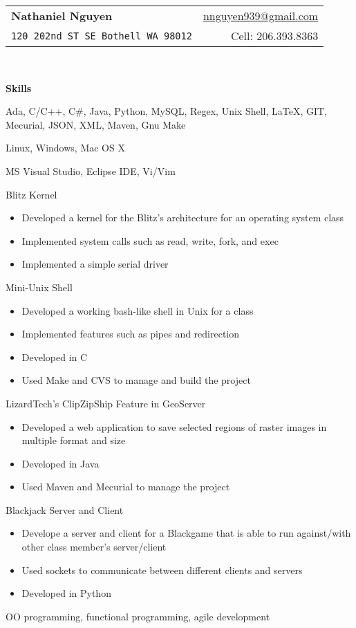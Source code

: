 \documentclass[letterpaper,11pt]{article}
\newcommand{\resitem}[1]{\item #1 \vspace{-2pt}}
\newcommand{\resheading}[1]{{\large \colorbox{mygrey}{\begin{minipage}{\textwidth}{\textbf{#1 \vphantom{p\^{E}}}}\end{minipage}}}}
\begin{document}
\newcommand{\mywebheader}{
\begin{tabular*}{7in}{l@{\extracolsep{\fill}}r}
	\textbf{{\LARGE Nathaniel Nguyen}} & \href{mailto:nnguyen939@gmail.com}{nnguyen939@gmail.com}\\
	{\footnotesize \texttt{{120 202nd ST SE Bothell WA 98012}}} & 
	{Cell:  206.393.8363}
	\end{tabular*}
\\
\vspace{0.1in}}

\mywebheader

\resheading{{Skills}}
	\begin{description}
		\item[Technologies:] { \footnotesize Ada, C/C++, C\#, Java, Python, MySQL, Regex, Unix Shell, {\LaTeX}, GIT, Mecurial, JSON, XML, Maven, Gnu Make}
		\item[Computer and OS:] { \footnotesize Linux, Windows, Mac OS X}
		\item[Software:]{\footnotesize
			{MS Visual Studio},
			{Eclipse IDE},
			{Vi/Vim}
} 
		\item[Projects:] {\footnotesize 
							\item Blitz Kernel
								\begin{itemize}
									\resitem{Developed a kernel for the Blitz's architecture for an operating system class}
									\resitem{Implemented system calls such as read, write, fork, and exec}
									\resitem{Implemented a simple serial driver}
								\end{itemize}
							\item Mini-Unix Shell
								\begin{itemize}
									\resitem{Developed a working bash-like shell in Unix for a class}
									\resitem{Implemented features such as pipes and redirection}
									\resitem{Developed in C}
									\resitem{Used Make and CVS to manage and build the project}
								\end{itemize}
								
							\item LizardTech's ClipZipShip Feature in GeoServer
								\begin{itemize}
									\resitem{Developed a web application to save selected regions of raster images in multiple format and size}
									\resitem{Developed in Java}
									\resitem{Used Maven and Mecurial to manage the project}
								\end{itemize}
							\item Blackjack Server and Client
								\begin{itemize}
									\resitem{Develope a server and client for a Blackgame that is able to run against/with other class member's server/client}
									\resitem{Used sockets to communicate between different clients and servers}
									\resitem{Developed in Python}
								\end{itemize}
						}
			\item[Others:] {\footnotesize OO programming, functional programming, agile development}
	\end{description} %
	
\end{document}
